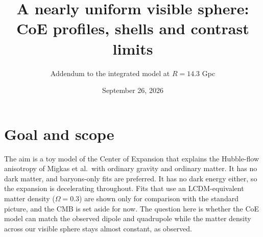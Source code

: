 \documentclass[10pt,letterpaper]{article}
\title{\vspace{-1.2cm}A nearly uniform visible sphere: CoE profiles, shells and contrast limits}
\author{Addendum to the integrated model at $R=14.3$ Gpc}
\date{September 26, 2026}
\begin{document}
\maketitle\vspace{-0.9cm}

\section{Goal and scope}
The aim is a toy model of the Center of Expansion that explains the Hubble-flow anisotropy of Migkas et al.\ with ordinary gravity and ordinary matter. It has no dark matter, and baryons-only fits are preferred. It has no dark energy either, so the expansion is decelerating throughout. Fits that use an LCDM-equivalent matter density ($\Omega=0.3$) are shown only for comparison with the standard picture, and the CMB is set aside for now. The question here is whether the CoE model can match the observed dipole and quadrupole while the matter density across our visible sphere stays almost constant, as observed.
\end{document}
